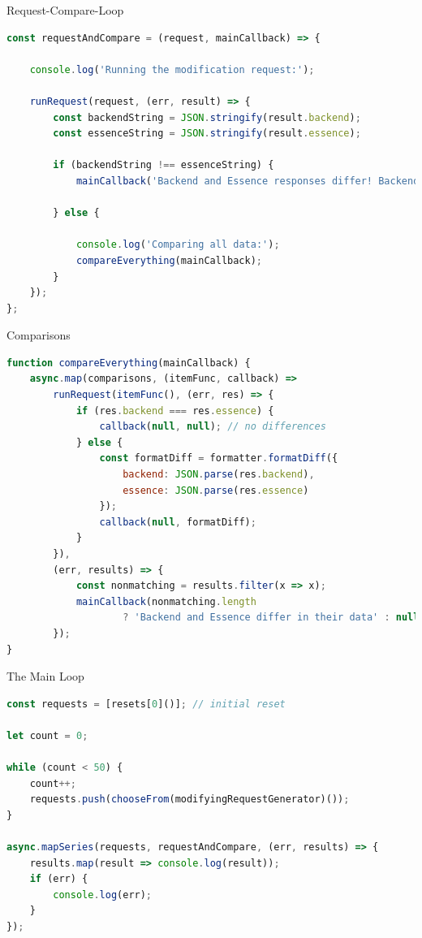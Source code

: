 \begin{frame}[fragile]{Request-Compare-Loop}

\begin{lstlisting}[language=JavaScript]
const requestAndCompare = (request, mainCallback) => {

    console.log('Running the modification request:');

    runRequest(request, (err, result) => {
        const backendString = JSON.stringify(result.backend);
        const essenceString = JSON.stringify(result.essence);
        
        if (backendString !== essenceString) {
            mainCallback('Backend and Essence responses differ! Backend: ' + backendString + ' - Essence: ' + essenceString);
            
        } else {
            
            console.log('Comparing all data:');
            compareEverything(mainCallback);
        }
    });
};
\end{lstlisting}

\end{frame}


\begin{frame}[fragile]{Comparisons}

\begin{lstlisting}[language=JavaScript]
function compareEverything(mainCallback) {
    async.map(comparisons, (itemFunc, callback) => 
        runRequest(itemFunc(), (err, res) => {
            if (res.backend === res.essence) {
                callback(null, null); // no differences
            } else {
                const formatDiff = formatter.formatDiff({
                    backend: JSON.parse(res.backend),
                    essence: JSON.parse(res.essence)
                });
                callback(null, formatDiff);
            }
        }),
        (err, results) => {
            const nonmatching = results.filter(x => x);
            mainCallback(nonmatching.length
                    ? 'Backend and Essence differ in their data' : null);
        });
}
\end{lstlisting}

\end{frame}



\begin{frame}[fragile]{The Main Loop}

\begin{lstlisting}[language=JavaScript]
const requests = [resets[0]()]; // initial reset

let count = 0;

while (count < 50) {
    count++;
    requests.push(chooseFrom(modifyingRequestGenerator)());
}

async.mapSeries(requests, requestAndCompare, (err, results) => {
    results.map(result => console.log(result));
    if (err) {
        console.log(err);
    }
});
\end{lstlisting}

\end{frame}


